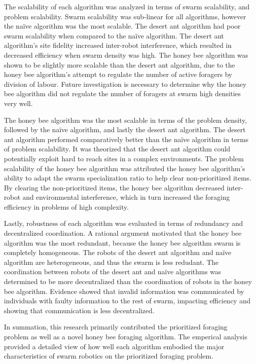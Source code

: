 The scalability of each algorithm was analyzed in terms of swarm scalability, and problem scalability. Swarm scalability was sub-linear for all algorithms, however the na\"ive algorithm was the most scalable. The desert ant algorithm had poor swarm scalability when compared to the na\"ive algorithm. The desert ant algorithm's site fidelity increased inter-robot interference, which resulted in decreased efficiency when swarm density was high. The honey bee algorithm was shown to be slightly more scalable than the desert ant algorithm, due to the honey bee algorithm's attempt to regulate the number of active foragers by division of labour. Future investigation is necessary to determine why the honey bee algorithm did not regulate the number of foragers at swarm high densities very well. 

The honey bee algorithm was the most scalable in terms of the problem density, followed by the na\"ive algorithm, and lastly the desert ant algorithm. The desert ant algorithm performed comparatively better than the na\"ive algorithm in terms of problem scalability. It was theorized that the desert ant algorithm could potentially exploit hard to reach sites in a complex environments. The problem scalability of the honey bee algorithm was attributed the honey bee algorithm's ability to adapt the swarm specialization ratio to help clear non-prioritized items. By clearing the non-prioritized items, the honey bee algorithm decreased inter-robot and environmental interference, which in turn increased the foraging efficiency in problems of high complexity.

Lastly, robustness of each algorithm was evaluated in terms of redundancy and decentralized coordination. A rational argument  motivated that the honey bee algorithm was the most redundant, because the honey bee algorithm swarm is completely homogeneous. The robots of the desert ant algorithm and na\"ive algorithm are heterogeneous, and thus the swarm is less redudant. The coordination between robots of the desert ant and na\"ive algorithms was determined to be more decentralized than the coordination of robots in the honey bee algorithm. Evidence showed that invalid information was communicated by  individuals with faulty information to the rest of swarm, impacting efficiency and showing that communication is less decentralized.

In summation, this research primarily contributed the prioritized foraging problem as well as a novel honey bee foraging algorithm. The emperical analysis provided a detailed view of how well each algorithm embodied the major characteristics of swarm robotics on the prioritized foraging problem.

